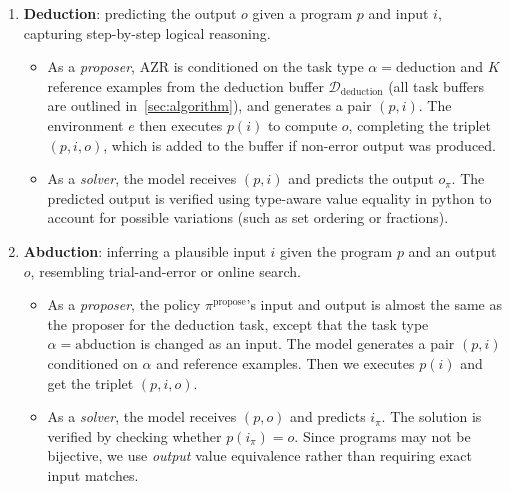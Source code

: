 \documentclass{article}
\begin{document}
\begin{enumerate}[leftmargin=*]
    \item \textbf{Deduction}: predicting the output \(o\) given a program \(p\) and input \(i\), capturing step-by-step logical reasoning. 
    \begin{itemize}[leftmargin=*]
        \item As a \emph{proposer}, AZR is conditioned on the task type \(\alpha=\text{deduction}\) and \(K\) reference examples from the deduction buffer \(\mathcal{D}_\text{deduction}\) (all task buffers are outlined in~\cref{sec:algorithm}), and generates a pair \((p, i)\). The environment \(e\) then executes \(p(i)\) to compute \(o\), completing the triplet \((p, i, o)\), which is added to the buffer if non-error output was produced.
        \item As a \emph{solver}, the model receives \((p, i)\) and predicts the output \(o_\pi\). The predicted output is verified using type-aware value equality in python to account for possible variations (such as set ordering or fractions).
    \end{itemize}
    \item \textbf{Abduction}: inferring a plausible input \(i\) given the program \(p\) and an output \(o\), resembling trial-and-error or online search.
    \begin{itemize}[leftmargin=*]
        \item As a \emph{proposer}, the policy \(\pi^\text{propose}\)'s input and output is almost the same as the proposer for the deduction task, except that the task type \(\alpha=\text{abduction}\) is changed as an input. The model generates a pair \((p, i)\) conditioned on \(\alpha\) and reference examples. Then we executes \(p(i)\) and get the triplet \((p, i, o)\).
        \item As a \emph{solver}, the model receives \((p, o)\) and predicts \(i_\pi\). The solution is verified by checking whether \(p(i_\pi) = o\). Since programs may not be bijective, we use \emph{output} value equivalence rather than requiring exact input matches.
    \end{itemize}


\end{enumerate}
\end{document}
